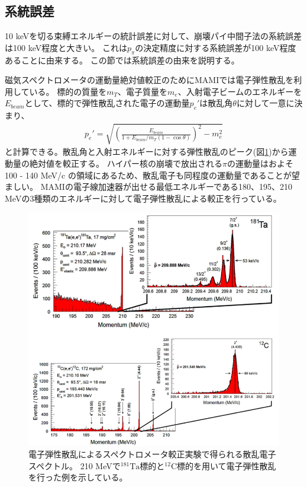 \documentclass[a4paper,11pt,uplatex]{jsbook}
\begin{document}
\subsection{系統誤差}\label{sec:systematic_error}
10 keVを切る束縛エネルギーの統計誤差に対して、崩壊パイ中間子法の系統誤差は100 keV程度と大きい。
これは$p_\pi$の決定精度に対する系統誤差が100 keV程度あることに由来する。
この節では系統誤差の由来を説明する。

磁気スペクトロメータの運動量絶対値較正のためにMAMIでは電子弾性散乱を利用している。
標的の質量を$m_T$、電子質量を$m_e$、入射電子ビームのエネルギーを$E_{beam}$として、標的で弾性散乱された電子の運動量$p_e'$は散乱角$\theta$に対して一意に決まり、
\begin{eqnarray}
  p_e' = \sqrt{\left(\frac{E_{beam}}{1 + E_{beam}/m_T(1 - \cos{\theta})} \right)^2 - m_e^2}\label{elastic scattering}
\end{eqnarray}
と計算できる。散乱角と入射エネルギーに対する弾性散乱のピーク(図\ref{elastic_scat})から運動量の絶対値を較正する。
ハイパー核の崩壊で放出される$\pi$の運動量はおよそ 100 - 140 MeV/c の領域にあるため、散乱電子も同程度の運動量であることが望ましい。
MAMIの電子線加速器が出せる最低エネルギーである180、195、210 MeVの3種類のエネルギーに対して電子弾性散乱による較正を行っている。
\begin{figure}[h]
  \centering
  \includegraphics[width=0.8\linewidth]{image/1-elastic.png}
  \caption[電子弾性散乱によるスペクトロメータ較正]{電子弾性散乱によるスペクトロメータ較正実験で得られる散乱電子スペクトル。
  210 MeVで$^{181}\text{Ta}$標的と$^{12}\text{C}$標的を用いて電子弾性散乱を行った例を示している\cite{elastic}。}
  \label{elastic_scat}
\end{figure}
\end{document}
